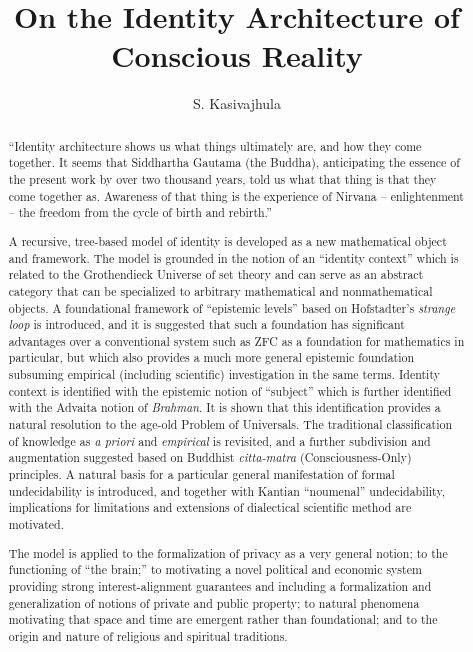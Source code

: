 \documentclass[pra,twocolumn,groupedaddress,10pt]{revtex4}
\theoremstyle{definition}
\begin{document}
\title{On the Identity Architecture of Conscious Reality}
\author{S. Kasivajhula}
{}

\begin{abstract}

``Identity architecture shows us what things ultimately are, and how they come together. It seems that Siddhartha Gautama (the Buddha), anticipating the essence of the present work by over two thousand years, told us what that thing is that they come together as. Awareness of that thing is the experience of Nirvana -- enlightenment -- the freedom from the cycle of birth and rebirth.''

A recursive, tree-based model of identity is developed as a new mathematical object and framework. The model is grounded in the notion of an ``identity context'' which is related to the Grothendieck Universe of set theory and can serve as an abstract category that can be specialized to arbitrary mathematical and nonmathematical objects. A foundational framework of ``epistemic levels'' based on Hofstadter's \emph{strange loop} is introduced, and it is suggested that such a foundation has significant advantages over a conventional system such as ZFC as a foundation for mathematics in particular, but which also provides a much more general epistemic foundation subsuming empirical (including scientific) investigation in the same terms. Identity context is identified with the epistemic notion of ``subject'' which is further identified with the Advaita notion of \emph{Brahman}. It is shown that this identification provides a natural resolution to the age-old Problem of Universals. The traditional classification of knowledge as \emph{a priori} and \emph{empirical} is revisited, and a further subdivision and augmentation suggested based on Buddhist \emph{citta-matra} (Consciousness-Only) principles. A natural basis for a particular general manifestation of formal undecidability is introduced, and together with Kantian ``noumenal'' undecidability, implications for limitations and extensions of dialectical scientific method are motivated.

The model is applied to the formalization of privacy as a very general notion; to the functioning of ``the brain;'' to motivating a novel political and economic system providing strong interest-alignment guarantees and including a formalization and generalization of notions of private and public property; to natural phenomena motivating that space and time are emergent rather than foundational; and to the origin and nature of religious and spiritual traditions.

\end{abstract}
\end{document}
